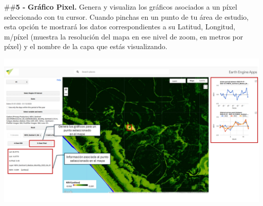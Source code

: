 \documentclass[
]{book}
\begin{document}
\#\#\textbf{5 -} \textbf{Gráfico Pixel.} Genera y visualiza los gráficos asociados a un píxel seleccionado con tu cursor. Cuando pinchas en un punto de tu área de estudio, esta opción te mostrará los datos correspondientes a su Latitud, Longitud, m/píxel (muestra la resolución del mapa en ese nivel de zoom, en metros por píxel) y el nombre de la capa que estás visualizando.

\includegraphics{assets/chart_pixel_es.png}

  
\end{document}
